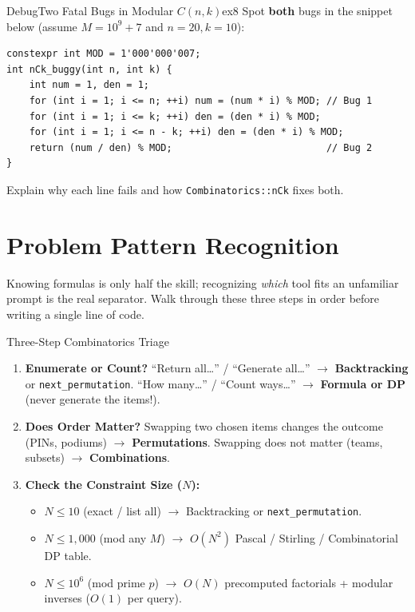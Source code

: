 \documentclass[11pt,a4paper]{article}
\theoremstyle{definition}
\begin{document}
\begin{tryitbox}{Debug}{Two Fatal Bugs in Modular $C(n, k)$}{ex8}
Spot \textbf{both} bugs in the snippet below (assume $M = 10^9 + 7$ and $n = 20, k = 10$):
\begin{lstlisting}[numbers=none, xleftmargin=4pt, framexleftmargin=4pt]
constexpr int MOD = 1'000'000'007;
int nCk_buggy(int n, int k) {
    int num = 1, den = 1;
    for (int i = 1; i <= n; ++i) num = (num * i) % MOD; // Bug 1
    for (int i = 1; i <= k; ++i) den = (den * i) % MOD;
    for (int i = 1; i <= n - k; ++i) den = (den * i) % MOD;
    return (num / den) % MOD;                           // Bug 2
}
\end{lstlisting}
Explain why each line fails and how \texttt{Combinatorics::nCk} fixes both.
\end{tryitbox}

\section{Problem Pattern Recognition}

Knowing formulas is only half the skill; recognizing \emph{which} tool fits an unfamiliar prompt is the real separator. Walk through these three steps in order before writing a single line of code.

\begin{calloutbox}{Three-Step Combinatorics Triage}
\begin{enumerate}
    \item \textbf{Enumerate or Count?} ``Return all\dots'' / ``Generate all\dots'' $\to$ \textbf{Backtracking} or \texttt{next\_permutation}. ``How many\dots'' / ``Count ways\dots'' $\to$ \textbf{Formula or DP} (never generate the items!).
    \item \textbf{Does Order Matter?} Swapping two chosen items changes the outcome (PINs, podiums) $\to$ \textbf{Permutations}. Swapping does not matter (teams, subsets) $\to$ \textbf{Combinations}.
    \item \textbf{Check the Constraint Size ($N$):}
    \begin{itemize}
        \item $N \le 10$ (exact / list all) $\to$ Backtracking or \texttt{next\_permutation}.
        \item $N \le 1{,}000$ (mod any $M$) $\to$ $O(N^2)$ Pascal / Stirling / Combinatorial DP table.
        \item $N \le 10^6$ (mod prime $p$) $\to$ $O(N)$ precomputed factorials + modular inverses ($O(1)$ per query).
    \end{itemize}
\end{enumerate}
\end{calloutbox}
\end{document}
